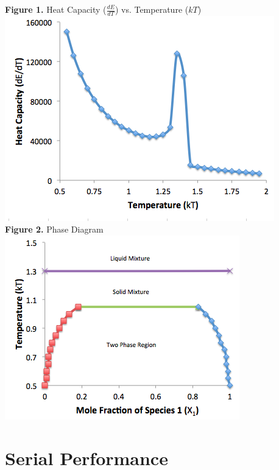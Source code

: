 \documentclass{article}
\begin{document}
\vspace{-5pt}
\begin{center}
\textbf{Figure 1.} Heat Capacity ($\frac{dE}{dT}$) vs. Temperature ($kT$)\\
\includegraphics[scale=0.5]{SerialMeltingTemp.png}\\

\vspace{5pt}
\textbf{Figure 2.} Phase Diagram\\
\includegraphics[scale=0.5]{SerialPhaseDiagram.png}\\
\end{center}

\newpage

\section*{Serial Performance}
\end{document}

